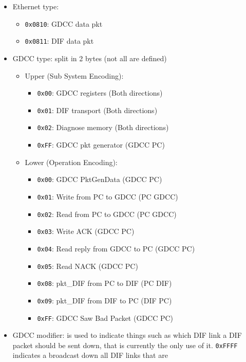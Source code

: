 \begin{itemize}
\item Ethernet type:
  \begin{itemize}
  \item \texttt{0x0810}: GDCC data pkt
  \item \texttt{0x0811}: DIF data pkt
  \end{itemize}
\item GDCC type: split in 2 bytes (not all are defined)
  \begin{itemize}
  \item Upper (Sub System Encoding):
    \begin{itemize}
    \item \texttt{0x00}: GDCC registers (Both directions)
    \item \texttt{0x01}: DIF transport (Both directions)
    \item \texttt{0x02}: Diagnose memory (Both directions)
    \item \texttt{0xFF}: GDCC pkt generator (GDCC \textrightarrow PC)
    \end{itemize}
  \item Lower (Operation Encoding):
    \begin{itemize}
    \item \texttt{0x00}: GDCC PktGenData (GDCC \textrightarrow PC)
    \item \texttt{0x01}: Write from PC to GDCC (PC \textrightarrow GDCC)
    \item \texttt{0x02}: Read from PC to GDCC (PC \textrightarrow GDCC)
    \item \texttt{0x03}: Write ACK (GDCC \textrightarrow PC)
    \item \texttt{0x04}: Read reply from GDCC to PC (GDCC \textrightarrow PC)
    \item \texttt{0x05}: Read NACK (GDCC \textrightarrow PC)
    \item \texttt{0x08}: pkt\_DIF from PC to DIF (PC \textrightarrow DIF)
    \item \texttt{0x09}: pkt\_DIF from DIF to PC (DIF \textrightarrow PC)
    \item \texttt{0xFF}: GDCC Saw Bad Packet (GDCC \textrightarrow PC)
    \end{itemize}
  \end{itemize}
\item GDCC modifier: is used to indicate things such as which DIF link a DIF
  packet should be sent down, that is currently the only use of
  it. \texttt{0xFFFF} indicates a broadcast down all DIF links that are

\end{itemize}
